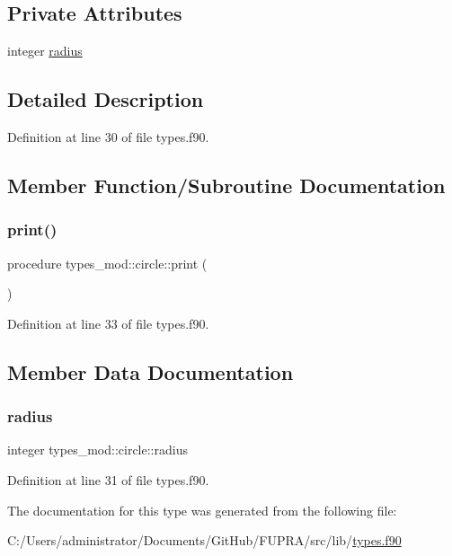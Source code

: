 \subsection*{Private Attributes}
\begin{DoxyCompactItemize}
\item 
integer \hyperlink{structtypes__mod_1_1circle_a89c9659f6cb66700e9f4f6c642242100}{radius}
\end{DoxyCompactItemize}


\subsection{Detailed Description}


Definition at line 30 of file types.\+f90.



\subsection{Member Function/\+Subroutine Documentation}
\mbox{\label{structtypes__mod_1_1circle_a69b68a4eba0ef69a0301786ef11b48fe}} 
\subsubsection{\texorpdfstring{print()}{print()}}
{\footnotesize\ttfamily procedure types\+\_\+mod\+::circle\+::print (\begin{DoxyParamCaption}{ }\end{DoxyParamCaption})\hspace{0.3cm}{\ttfamily [private]}}



Definition at line 33 of file types.\+f90.



\subsection{Member Data Documentation}
\mbox{\label{structtypes__mod_1_1circle_a89c9659f6cb66700e9f4f6c642242100}} 
\subsubsection{\texorpdfstring{radius}{radius}}
{\footnotesize\ttfamily integer types\+\_\+mod\+::circle\+::radius\hspace{0.3cm}{\ttfamily [private]}}



Definition at line 31 of file types.\+f90.



The documentation for this type was generated from the following file\+:\begin{DoxyCompactItemize}
\item 
C\+:/\+Users/administrator/\+Documents/\+Git\+Hub/\+F\+U\+P\+R\+A/src/lib/\hyperlink{types_8f90}{types.\+f90}\end{DoxyCompactItemize}
